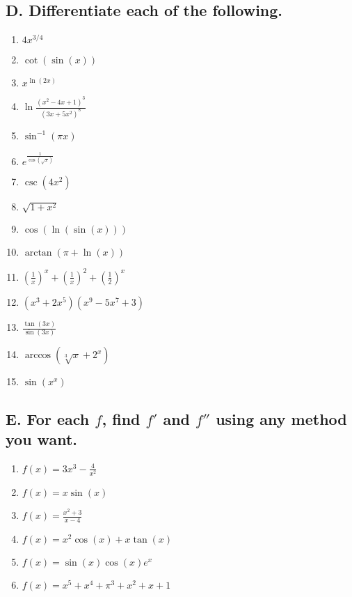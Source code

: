 \documentclass{article}
\begin{document}
\subsection*{D. Differentiate each of the following.}
\begin{multicols}{3}
\begin{enumerate}
\item $4x^{3/4}$
\item $\cot(\sin(x))$
\item $x^{\ln(2x)}$
\item $\ln\frac{(x^2-4x+1)^3}{(3x+5x^2)^8}$
\item $\sin^{-1}(\pi x)$
\item $e^{\frac{1}{\cos(\sqrt{x})}}$
\item $\csc(4x^2)$
\item $\sqrt{1+x^2}$
\item $\cos(\ln(\sin(x)))$
\item $\arctan(\pi +\ln(x))$
\item $\left(\frac{1}{x}\right)^x+\left(\frac{1}{x}\right)^2+\left(\frac{1}{2}\right)^x$
\item $(x^3+2x^5)(x^{9}-5x^7+3)$
\item $\frac{\tan(3x)}{\sin(3x)}$
\item $\arccos(\sqrt[3]{x}+2^x)$
\item $\sin(x^x)$
\end{enumerate}
\end{multicols}

\subsection*{E. For each $f$, find $f'$ and $f''$ using any method you want.}
\begin{multicols}{3}
\begin{enumerate}
\item $f(x)=3x^3-\frac{4}{x^2}$
\item $f(x)=x\sin(x)$
\item $f(x)=\frac{x^2+3}{x-4}$
\item $f(x)=x^2\cos(x)+x\tan(x)$
\item $f(x)=\sin(x)\cos(x)e^x$
\item $f(x)=x^5+x^4+\pi^3+x^2+x+1$
\end{enumerate}
\end{multicols}
\end{document}
